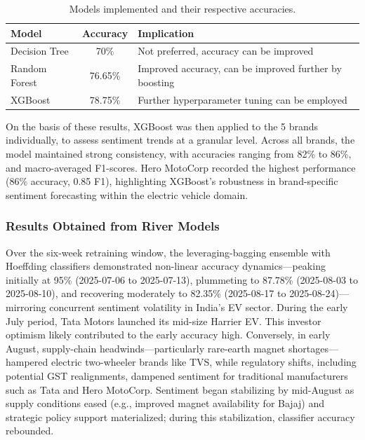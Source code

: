 \documentclass[pdflatex,sn-mathphys-num]{sn-jnl}%
\begin{document}
\begin{table}[h!]
\centering
\caption{Models implemented and their respective accuracies.}
\label{tab:models}
\begin{tabular}{|l|c|p{7cm}|}
\hline
\textbf{Model} & \textbf{Accuracy} & \textbf{Implication} \\ \hline
Decision Tree  & 70\%    & Not preferred, accuracy can be improved \\ \hline
Random Forest  & 76.65\% & Improved accuracy, can be improved further by boosting \\ \hline
XGBoost        & 78.75\% & Further hyperparameter tuning can be employed \\ \hline
\end{tabular}
\end{table}

On the basis of these results, XGBoost was then applied to the 5 brands individually, to assess sentiment trends at a granular level. Across all brands, the model maintained strong consistency, with accuracies ranging from 82\% to 86\%, and macro-averaged F1-scores. Hero MotoCorp recorded the highest performance (86\% accuracy, 0.85 F1), highlighting XGBoost's robustness in brand-specific sentiment forecasting within the electric vehicle domain.

\subsubsection{Results Obtained from River Models}
Over the six-week retraining window, the leveraging-bagging ensemble with Hoeffding classifiers demonstrated non-linear accuracy dynamics—peaking initially at 95\% (2025-07-06 to 2025-07-13), plummeting to 87.78\% (2025-08-03 to 2025-08-10), and recovering moderately to 82.35\% (2025-08-17 to 2025-08-24)—mirroring concurrent sentiment volatility in India’s EV sector. During the early July period, Tata Motors launched its mid-size Harrier EV. This investor optimism likely contributed to the early accuracy high.
Conversely, in early August, supply-chain headwinds—particularly rare-earth magnet shortages—hampered electric two-wheeler brands like TVS, while regulatory shifts, including potential GST realignments, dampened sentiment for traditional manufacturers such as Tata and Hero MotoCorp. Sentiment began stabilizing by mid-August as supply conditions eased (e.g., improved magnet availability for Bajaj) and strategic policy support materialized; during this stabilization, classifier accuracy rebounded.
\end{document}
